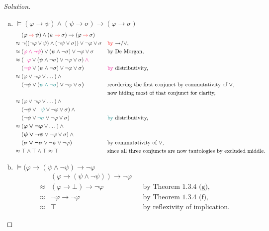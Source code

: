 \documentclass[letter]{article}
\theoremstyle{definition}
\newenvironment{solution}
{\begin{proof}[Solution]}
        {\end{proof}}
\renewcommand{\phi}{\varphi}
\begin{document}
\begin{solution}
\begin{enumerate}[(a)]
  \item $\models (\phi \to \psi) \land (\psi \to \sigma) \to (\phi \to \sigma)$
\begin{align*}
    & (\phi \colop{red}{\to} \psi) \land (\psi \colop{red}{\to} \sigma) \to (\phi \colop{red}{\to} \sigma) &&
\\ \approx{}
    & \neg ((\neg \phi \lor \psi) \land (\neg \psi \lor \sigma)) \lor \neg \phi \lor \sigma
    && \text{\textcolor{red}{by} $\to$/$\lor$,}
\\ \approx{}
    & ({\color{magenta}\phi \land \neg \psi}) \lor (\psi \land \neg \sigma) \lor \neg \phi \lor \sigma
    && \text{by De Morgan,}
\\ \approx{}
    & ({\color{magenta}\phantom{\neg}\phi} \lor (\psi \land \neg \sigma) \lor \neg \phi \lor \sigma) \colop{magenta}{\land} {} &&
\\  & ({\color{magenta}         \neg \psi} \lor (\psi \land \neg \sigma) \lor \neg \phi \lor \sigma)
    && \text{\textcolor{magenta}{by} distributivity,}
\\ \approx{}
    & (\phi \lor \neg \phi \lor \dots) \land {} &&
\\
    & (\neg \psi \lor ({\color{teal}\psi \land \neg \sigma}) \lor \neg \phi \lor \sigma)
    && \text{reordering the first conjunct by commutativity of $\lor$,}
\\ & && \text{now hiding most of that conjunct for clarity,}
\\ \approx{}
    & (\phi \lor \neg \phi \lor \dots) \land {} &&
\\  & (\neg \psi \lor {\color{teal}\phantom{\neg}\psi}   \lor \neg \phi \lor \sigma) \land {} &&
\\  & (\neg \psi \lor {\color{teal}         \neg \sigma} \lor \neg \phi \lor \sigma)
    && \text{\textcolor{teal}{by} distributivity,}
\\ \approx {}
    & (\bm{\phi \lor \neg \phi} \lor \dots) \land {} &&
\\  & (\bm{\psi \lor \neg \psi} \lor \neg \phi \lor \sigma) \land {} &&
\\  & (\bm{\sigma \lor \neg \sigma} \lor \neg \psi \lor \neg \phi)
    && \text{by commutativity of $\lor$,}
\\ \approx {}
    & \top \land \top \land \top \approx \top
    && \text{since all three conjuncts are now tautologies by excluded middle.}
\end{align*}

  \item $\models (\phi \to (\psi \land \neg \psi) \to \neg \phi$
\begin{align*}
  & (\phi \to (\psi \land \neg \psi)) \to \neg \phi &&
\\ \approx{}
  & (\phi \to \bot) \to \neg \phi
  && \text{by Theorem 1.3.4 (g),}
\\ \approx{}
  & \neg \phi \to \neg \phi
  && \text{by Theorem 1.3.4 (f),}
\\ \approx{}
  & \top && \text{by reflexivity of implication.}
\end{align*}


\end{enumerate}
\end{solution}
\end{document}
